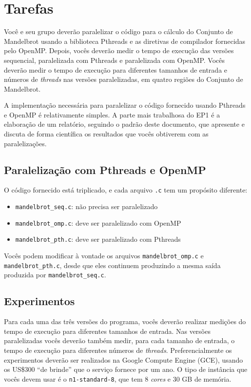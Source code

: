 \documentclass[final,12pt,a4paper]{elsarticle}
\begin{document}
\section{Tarefas}

Você e seu grupo deverão paralelizar o código para o cálculo do Conjunto de
Mandelbrot usando a biblioteca Pthreads e as diretivas de compilador fornecidas
pelo OpenMP. Depois, vocês deverão medir o tempo de execução das versões
sequencial, paralelizada com Pthreads e paralelizada com OpenMP. Vocês deverão
medir o tempo de execução para diferentes tamanhos de entrada e números de
\textit{threads} nas versões paralelizadas, em quatro regiões do Conjunto
de Mandelbrot.

A implementação necessária para paralelizar o código fornecido usando Pthreads
e OpenMP é relativamente simples. A parte mais trabalhosa do EP1 é a elaboração
de um relatório, seguindo o padrão deste documento, que apresente e discuta de
forma científica os resultados que vocês obtiverem com as paralelizações.

\subsection{Paralelização com Pthreads e OpenMP}

O código fornecido está triplicado, e cada arquivo \texttt{.c}
tem um propósito diferente:

\begin{itemize}
    \item \texttt{mandelbrot\_seq.c}: não precisa ser paralelizado
    \item \texttt{mandelbrot\_omp.c}: deve ser paralelizado com OpenMP
    \item \texttt{mandelbrot\_pth.c}: deve ser paralelizado com Pthreads
\end{itemize}

Vocês podem modificar à vontade os arquivos \texttt{mandelbrot\_omp.c} e
\texttt{mandelbrot\_pth.c}, desde que eles continuem produzindo a mesma saída
produzida por \texttt{mandelbrot\_seq.c}.

\subsection{Experimentos}

Para cada uma das três versões do programa, vocês deverão realizar medições do
tempo de execução para diferentes tamanhos de entrada. Nas versões
paralelizadas vocês deverão também medir, para cada tamanho de entrada, o tempo
de execução para diferentes números de \textit{threads}. Preferencialmente os
experimentos deverão ser realizados na Google Compute Engine (GCE), usando os
US\$300 ``de brinde'' que o serviço fornece por um ano. O tipo de instância que
vocês devem usar é o \texttt{n1-standard-8}, que tem 8 \textit{cores} e 30 GB
de memória.
\end{document}
